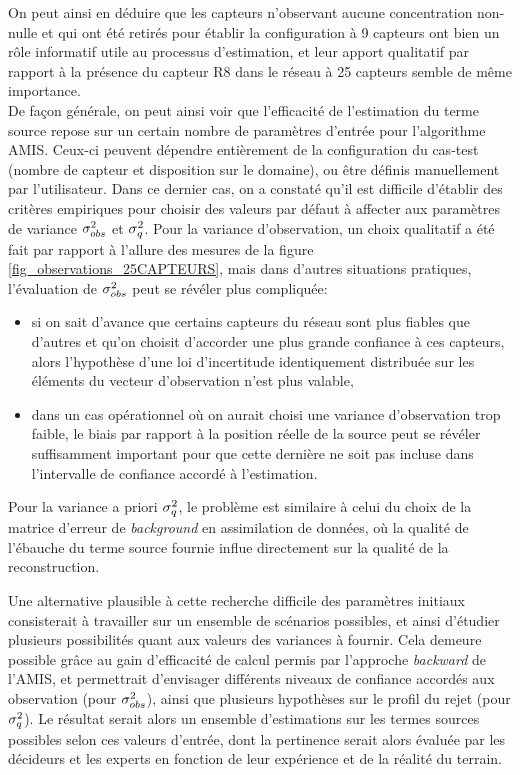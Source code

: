 On peut ainsi en déduire que les capteurs n'observant aucune concentration  non-nulle et qui ont été retirés pour établir la configuration à 9 capteurs ont bien un rôle informatif utile au processus d'estimation, et leur apport qualitatif par rapport à la présence du capteur R8 dans le réseau à 25 capteurs semble de même importance.\\

De façon générale, on peut ainsi voir que l'efficacité de l'estimation du terme source repose sur un certain nombre de paramètres d'entrée pour l'algorithme AMIS. Ceux-ci peuvent dépendre entièrement de la configuration du cas-test (nombre de capteur et disposition sur le domaine), ou être définis manuellement par l'utilisateur. Dans ce dernier cas, on a constaté qu'il est difficile d'établir des critères empiriques pour choisir des valeurs par défaut à affecter aux paramètres de variance ${\sigma_{obs}^2}$ et $\sigma_q^2$. Pour la variance d'observation, un choix qualitatif a été fait par rapport à l'allure des mesures de la figure \ref{fig_observations_25CAPTEURS}, mais dans d'autres situations pratiques, l'évaluation de ${\sigma_{obs}^2}$ peut se révéler plus compliquée:
\begin{itemize}
	\item si on sait d'avance que certains capteurs du réseau sont plus fiables que d'autres et qu'on choisit d'accorder une plus grande confiance à ces capteurs, alors l'hypothèse d'une loi d'incertitude identiquement distribuée sur les éléments du vecteur d'observation n'est plus valable,
	\item dans un cas opérationnel où on aurait choisi une variance d'observation trop faible, le biais par rapport à la position réelle de la source peut se révéler suffisamment important pour que cette dernière ne soit pas incluse dans l'intervalle de confiance accordé à l'estimation.
\end{itemize}

Pour la variance a priori $\sigma_q^2$, le problème est similaire à celui du choix de la matrice d'erreur de \textit{background} en assimilation de données, où la qualité de l'ébauche du terme source fournie influe directement sur la qualité de la reconstruction. 

Une alternative plausible à cette recherche difficile des paramètres initiaux consisterait à travailler sur un ensemble de scénarios possibles, et ainsi d'étudier plusieurs possibilités quant aux valeurs des variances à fournir. Cela demeure possible grâce au gain d'efficacité de calcul permis par l'approche \textit{backward} de l'AMIS, et permettrait d'envisager différents niveaux de confiance accordés aux observation (pour ${\sigma_{obs}^2}$), ainsi que plusieurs hypothèses sur le profil du rejet (pour $\sigma_q^2$). Le résultat serait alors un ensemble d'estimations  sur les termes sources possibles selon ces valeurs d'entrée, dont la pertinence serait alors évaluée par les décideurs et les experts en fonction de leur expérience et de la réalité du terrain.




 
 
 




